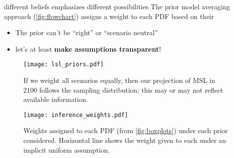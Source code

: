 \begin{block}{different beliefs emphasizes different possibilities}
    The prior model averaging approach (\cref{fig:flowchart}) assigns a weight to each PDF based on their
    \begin{itemize}
        \item The prior can't be ``right''  \cite{gelman_workflow:2020,gelman_philosophy:2013} or ``scenario neutral'' \cite{quinn_exploratory:2020}
        \item let's at least \textbf{make assumptions transparent}!
    \end{itemize}
    \begin{figure}
        \centering
        \texttt{[image: lsl\_priors.pdf]}
        \caption{
            If we weight all scenarios equally, then our projection of MSL in 2100 follows the sampling distribution; this may or may not reflect available information.        }
    \end{figure}
    \begin{figure}
        \centering
        \texttt{[image: inference\_weights.pdf]}
        \caption{
            Weights assigned to each PDF (from \cref{fig:boxplots}) under each prior considered.
            Horizontal line shows the weight given to each under an implicit uniform assumption.
        }
    \end{figure}
\end{block}